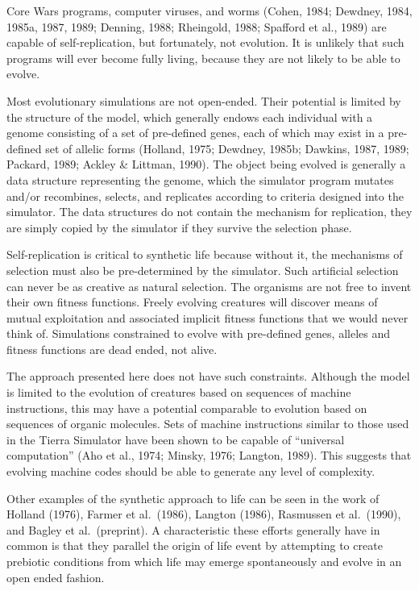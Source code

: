 Core Wars programs, computer viruses, and worms (Cohen, 1984; Dewdney, 1984,
1985a, 1987, 1989; Denning, 1988; Rheingold, 1988; Spafford et al., 1989) are
capable of self-replication, but fortunately, not evolution.  It is unlikely
that such programs will ever become fully living, because they are not likely
to be able to evolve.

Most evolutionary simulations are not open-ended.  Their potential is limited
by the structure of the model, which generally endows each individual with a
genome consisting of a set of pre-defined genes, each of which may exist
in a pre-defined set of allelic forms (Holland, 1975; Dewdney, 1985b; Dawkins,
1987, 1989; Packard, 1989; Ackley \& Littman, 1990).  The object being evolved
is generally a data structure representing the genome, which the simulator
program mutates and/or recombines, selects, and replicates according to
criteria designed into the simulator.  The data structures do not contain the
mechanism for replication, they are simply copied by the simulator if they
survive the selection phase.

Self-replication is critical to synthetic life because without it, the
mechanisms of selection must also be pre-determined by the simulator.  Such
artificial selection can never be as creative as natural selection.  The
organisms are not free to invent their own fitness functions.  Freely
evolving creatures will discover means of mutual exploitation and
associated implicit fitness functions that we would never think of.
Simulations constrained to evolve with pre-defined genes, alleles and fitness
functions are dead ended, not alive.

The approach presented here does not have such constraints.  Although the
model is limited to the evolution of creatures based on sequences of machine
instructions, this may have a potential comparable to evolution based on
sequences of organic molecules.  Sets of machine instructions similar to
those used in the Tierra Simulator have been shown to be capable of
``universal computation'' (Aho et al., 1974; Minsky, 1976; Langton, 1989).
This suggests that evolving machine codes should be able to generate any
level of complexity.

Other examples of the synthetic approach to life can be seen in the work of
Holland (1976), Farmer et al.\ (1986), Langton (1986), Rasmussen et al.\
(1990), and Bagley et al.\ (preprint).  A characteristic these efforts
generally have in common is that they parallel the origin of life event by
attempting to create prebiotic conditions from which life may emerge
spontaneously and evolve in an open ended fashion.

